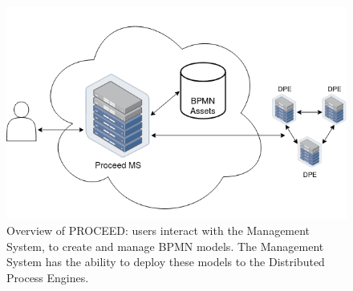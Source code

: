\begin{figure}[H]
	\centering
	\includegraphics[scale=0.45]{images/quick-ms-overview.drawio.png}
	\caption{Overview of PROCEED: users interact with the Management System, to create and
		manage BPMN models. The Management System has the ability to deploy these models to the Distributed Process Engines.}
	\label{fig:proceed-overview}
	\vspace{-1em} %
\end{figure}




